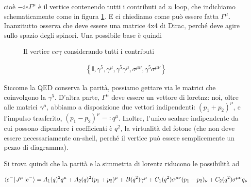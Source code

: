 \documentclass[11pt]{report}
\begin{document}
cioè \(-ie\Gamma^\mu\) è il vertice contenendo tutti i contributi ad \(n\) loop, che indichiamo schematicamente come in figura \ref{fig:qedvertexfull}. E ci chiediamo come può essere fatta \(\Gamma^\mu\). Inanzitutto osserva che deve essere una matrice 4x4 di Dirac, perché deve agire sullo spazio degli spinori. Una possibile base è quindi 

\begin{figure}
    \caption{Il vertice \(ee\gamma\) considerando tutti i contributi}
    \label{fig:qedvertexfull}
    \begin{center}
    \end{center}
\end{figure}


\begin{align}
    \left\{\mathbb{I}, \gamma^5, \gamma^\mu, \gamma^5\gamma^\mu, \sigma^{\mu\nu}, \gamma^5 \sigma^{\mu\nu}\right\}
\end{align}

Siccome la QED conserva la parità, possiamo gettare via le matrici che coinvolgono la \(\gamma^5\). D'altra parte, \(\Gamma^\mu\) deve essere un vettore di loretnz: noi, oltre alle matrici \(\gamma^\mu\), abbiamo a disposizione due vettori indipendenti: \((p_1 + p_2)^\mu\), e l'impulso trasferito, \((p_1-p_2)^\mu =: q^\mu\). Inoltre, l'unico scalare indipendente da cui possono dipendere i coefficienti è \(q^2\), la virtualità del fotone (che non deve essere necessariamente on-shell, perché il vertice può essere semplicemente un pezzo di diagramma). 

Si trova quindi che la parità e la simmetria di lorentz riducono le possibilità ad 

\begin{align}
    \bra{e^-}J^\mu \ket{e^-} = A_1(q)^2 q^\mu + A_2(q)^2(p_1+p_2)^\mu + B(q^2)\gamma^\mu + C_1(q^2)\sigma^{\mu\nu}(p_1+p_2)_\nu + C_2(q^2)\sigma^{\mu\nu}q_\nu
\end{align}
\end{document}
